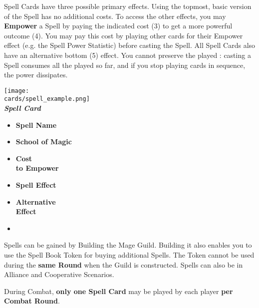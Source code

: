 \begin{multicols*}{2}
Spell Cards have three possible primary effects.
Using the topmost, basic version of the Spell has no additional costs.
To access the other effects, you may \textbf{Empower} a Spell by paying the indicated cost (3) to get a more powerful outcome (4).
You may pay this cost by playing other cards for their Empower  effect (e.g. the Spell Power Statistic) before casting the Spell.
All Spell Cards also have an alternative bottom (5)  effect.
You cannot preserve the played : casting a Spell consumes all the  played so far, and if you stop playing cards in sequence, the power dissipates.\par

{
  \centering
  \texttt{[image: \\cards/spell\_example.png]}\\
  \medskip
  \footnotesize{\textbf{\textit{\textcolor{darkcandyapplered}{Spell Card}}}}
  \scriptsize
  \begin{multicols}{2}
    \begin{itemize}[itemsep=5pt]
      \item[\textbf{1.}] \textbf{Spell Name}
      \item[\textbf{2.}] \textbf{School of Magic}
      \item[\textbf{3.}] \textbf{Cost\\to Empower}
      \item[\textbf{4.}] \textbf{Spell Effect}
      \item[\textbf{5.}] \textbf{Alternative\\Effect}
      \item[]
    \end{itemize}
  \end{multicols}
}

Spells can be gained by Building the Mage Guild.
Building it also enables you to use the Spell Book Token for buying additional Spells.
The Token cannot be used during the \textbf{same Round} when the Guild is constructed. Spells can also be  in Alliance and Cooperative Scenarios.

During Combat, \textbf{only one Spell Card} may be played by each player \textbf{per Combat Round}.



\end{multicols*}
